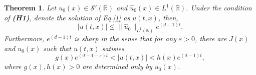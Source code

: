 \documentclass[10pt,a4paper]{amsart}
\newtheorem{theorem}{Theorem}
\newcommand{\R}{\mathbb{R}}
\begin{document}
\begin{theorem}\label{thm1}
 Let $u_{0}(x)\in \mathscr{S}'(\mathbb{R})$ and $\hat{u}_{0}(x)\in L^{1}(\R)$. Under the condition of \textbf{(H1)}, denote the solution of Eq.\eqref{1} as \(u(t,x)\), then,
\begin{equation}\label{T1}
	|u(t,x)|\leq \|\hat{u}_0\|_{L^1(\R)}e^{(d-1)t}.
\end{equation}
Furthermore, $e^{(d-1)t}$ is sharp in the sense that for any $\varepsilon>0$, there are $J(x)$ and $  u_0(x)$  such that $u(t,x)$ satisies 
\begin{equation}\label{T2}
		g(x)e^{(d-1-\varepsilon)t}<|u(t,x)|<h(x)e^{(d-1)t},
\end{equation}
 where $g(x), h(x)>0$ are determined only by $u_{0}(x)$. 
\end{theorem}
\end{document}
